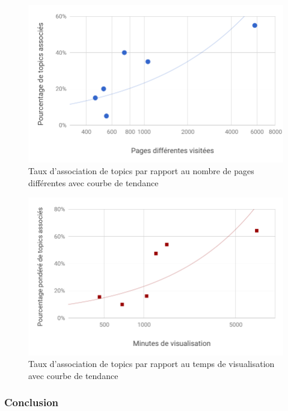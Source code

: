 			\begin{figure}[!h]
				\centering
				\includegraphics[height=0.6\textwidth]{images/results/chart-3}
				\caption{Taux d'association de topics par rapport au nombre de pages différentes avec courbe de tendance}
				\label{chart-3}
			\end{figure}

			\begin{figure}[!h]
				\centering
				\includegraphics[height=0.6\textwidth]{images/results/chart-4}
				\caption{Taux d'association de topics par rapport au temps de visualisation avec courbe de tendance}
				\label{chart-4}
			\end{figure}

		\subsubsection{Conclusion}

